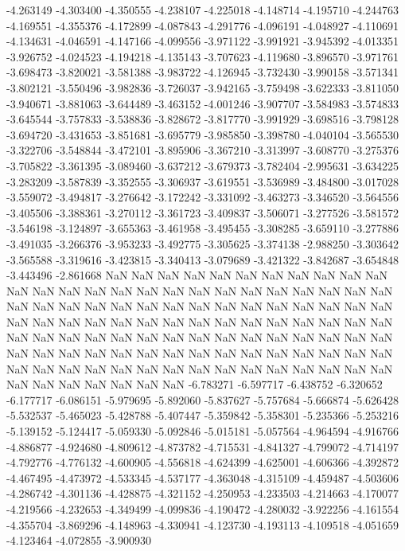 -4.263149
-4.303400
-4.350555
-4.238107
-4.225018
-4.148714
-4.195710
-4.244763
-4.169551
-4.355376
-4.172899
-4.087843
-4.291776
-4.096191
-4.048927
-4.110691
-4.134631
-4.046591
-4.147166
-4.099556
-3.971122
-3.991921
-3.945392
-4.013351
-3.926752
-4.024523
-4.194218
-4.135143
-3.707623
-4.119680
-3.896570
-3.971761
-3.698473
-3.820021
-3.581388
-3.983722
-4.126945
-3.732430
-3.990158
-3.571341
-3.802121
-3.550496
-3.982836
-3.726037
-3.942165
-3.759498
-3.622333
-3.811050
-3.940671
-3.881063
-3.644489
-3.463152
-4.001246
-3.907707
-3.584983
-3.574833
-3.645544
-3.757833
-3.538836
-3.828672
-3.817770
-3.991929
-3.698516
-3.798128
-3.694720
-3.431653
-3.851681
-3.695779
-3.985850
-3.398780
-4.040104
-3.565530
-3.322706
-3.548844
-3.472101
-3.895906
-3.367210
-3.313997
-3.608770
-3.275376
-3.705822
-3.361395
-3.089460
-3.637212
-3.679373
-3.782404
-2.995631
-3.634225
-3.283209
-3.587839
-3.352555
-3.306937
-3.619551
-3.536989
-3.484800
-3.017028
-3.559072
-3.494817
-3.276642
-3.172242
-3.331092
-3.463273
-3.346520
-3.564556
-3.405506
-3.388361
-3.270112
-3.361723
-3.409837
-3.506071
-3.277526
-3.581572
-3.546198
-3.124897
-3.655363
-3.461958
-3.495455
-3.308285
-3.659110
-3.277886
-3.491035
-3.266376
-3.953233
-3.492775
-3.305625
-3.374138
-2.988250
-3.303642
-3.565588
-3.319616
-3.423815
-3.340413
-3.079689
-3.421322
-3.842687
-3.654848
-3.443496
-2.861668
NaN
NaN
NaN
NaN
NaN
NaN
NaN
NaN
NaN
NaN
NaN
NaN
NaN
NaN
NaN
NaN
NaN
NaN
NaN
NaN
NaN
NaN
NaN
NaN
NaN
NaN
NaN
NaN
NaN
NaN
NaN
NaN
NaN
NaN
NaN
NaN
NaN
NaN
NaN
NaN
NaN
NaN
NaN
NaN
NaN
NaN
NaN
NaN
NaN
NaN
NaN
NaN
NaN
NaN
NaN
NaN
NaN
NaN
NaN
NaN
NaN
NaN
NaN
NaN
NaN
NaN
NaN
NaN
NaN
NaN
NaN
NaN
NaN
NaN
NaN
NaN
NaN
NaN
NaN
NaN
NaN
NaN
NaN
NaN
NaN
NaN
NaN
NaN
NaN
NaN
NaN
NaN
NaN
NaN
NaN
NaN
NaN
NaN
NaN
NaN
NaN
NaN
NaN
NaN
NaN
NaN
NaN
NaN
-6.783271
-6.597717
-6.438752
-6.320652
-6.177717
-6.086151
-5.979695
-5.892060
-5.837627
-5.757684
-5.666874
-5.626428
-5.532537
-5.465023
-5.428788
-5.407447
-5.359842
-5.358301
-5.235366
-5.253216
-5.139152
-5.124417
-5.059330
-5.092846
-5.015181
-5.057564
-4.964594
-4.916766
-4.886877
-4.924680
-4.809612
-4.873782
-4.715531
-4.841327
-4.799072
-4.714197
-4.792776
-4.776132
-4.600905
-4.556818
-4.624399
-4.625001
-4.606366
-4.392872
-4.467495
-4.473972
-4.533345
-4.537177
-4.363048
-4.315109
-4.459487
-4.503606
-4.286742
-4.301136
-4.428875
-4.321152
-4.250953
-4.233503
-4.214663
-4.170077
-4.219566
-4.232653
-4.349499
-4.099836
-4.190472
-4.280032
-3.922256
-4.161554
-4.355704
-3.869296
-4.148963
-4.330941
-4.123730
-4.193113
-4.109518
-4.051659
-4.123464
-4.072855
-3.900930
